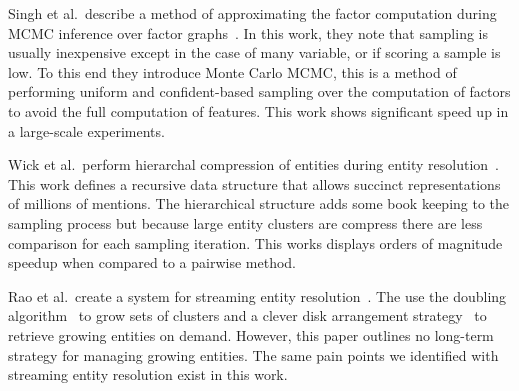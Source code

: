 Singh et al.\ describe a method of approximating the factor computation during MCMC
inference over factor graphs~\cite{singh2011large}.
In this work, they note that sampling is usually inexpensive except in the case
of many variable, or if scoring a sample is low. To this end they introduce Monte
Carlo MCMC, this is a method of performing uniform and confident-based sampling
over the computation of factors to avoid the full computation of features.
This work shows significant speed up in a large-scale experiments.


Wick et al.\ perform hierarchal compression of entities during
entity resolution~\cite{wick2013discriminative}.
This work defines a recursive data structure that allows succinct representations
of millions of mentions. 
The hierarchical structure adds some book keeping to the sampling process but because
large entity clusters are compress there are less comparison for each sampling iteration. 
This works displays orders of magnitude speedup
when compared to a pairwise method.

Rao et al.\ create a system for streaming entity resolution~\cite{rao2010streaming}.
The use the doubling algorithm~\cite{charikar1997incremental} to grow sets of clusters
and a clever disk arrangement strategy~\cite{omiecinski1984global} to retrieve
growing entities on demand.
However, this paper outlines no long-term strategy for managing growing entities.
The same pain points we identified with streaming entity resolution exist in this work.



